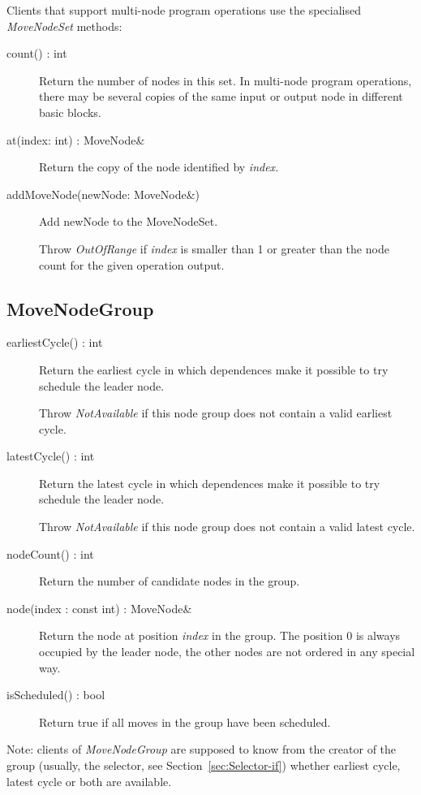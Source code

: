 \documentclass[a4paper,twoside]{tce}
\begin{document}
Clients that support multi-node program operations use the specialised
\emph{MoveNodeSet} methods:
\begin{description}
\item[count() : int] %
  Return the number of nodes in this set. In multi-node program operations,
  there may be several copies of the same input or output node in different
  basic blocks.
\item[at(index: int) : MoveNode\&] %
  Return the copy of the node identified by \emph{index}.
\item[addMoveNode(newNode: MoveNode\&) ] %
  Add newNode to the MoveNodeSet. %

  Throw \emph{OutOfRange} if \emph{index} is smaller than 1 or greater than
  the node count for the given operation output.
\end{description}

\subsection{MoveNodeGroup}

\begin{description}
\item[earliestCycle() : int]%
  Return the earliest cycle in which dependences make it possible to try
  schedule the leader node.

  Throw \emph{NotAvailable} if this node group does not contain a valid
  earliest cycle.
\item[latestCycle() : int]%
  Return the latest cycle in which dependences make it possible to try
  schedule the leader node.

  Throw \emph{NotAvailable} if this node group does not contain a valid
  latest cycle.

\item[nodeCount() : int]%
  Return the number of candidate nodes in the group.

\item[node(index : const int) : MoveNode\&]%
  Return the node at position \emph{index} in the group. The position 0 is
  always occupied by the leader node, the other nodes are not ordered in any
  special way.

\item[isScheduled() : bool]%
  Return true if all moves in the group have been scheduled.
\end{description}

Note: clients of \emph{MoveNodeGroup} are supposed to know from the creator
of the group (usually, the selector, see Section~\ref{sec:Selector-if})
whether earliest cycle, latest cycle or both are available.
\end{document}
